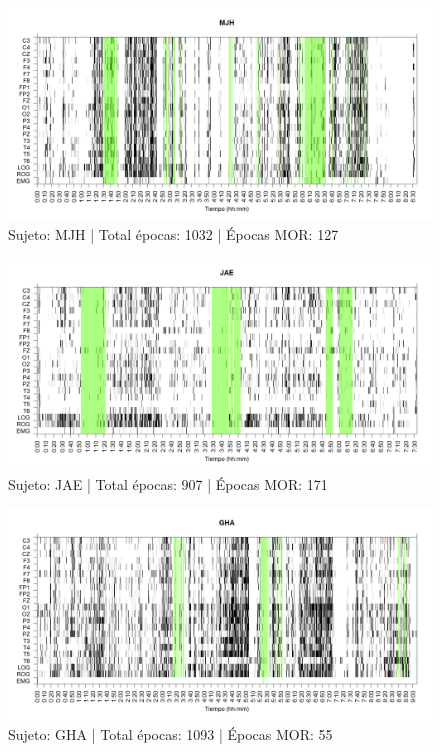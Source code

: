 \begin{figure}
\centering
\includegraphics[width=\linewidth]
{./muypreeliminar170408/MJNNVIGILOS_est.png} 
\caption{Sujeto: MJH | Total \'epocas: 1032 | \'Epocas MOR: 127
}
\label{grf:MJH}
\end{figure}


\begin{figure}
\centering
\includegraphics[width=\linewidth]
{./muypreeliminar170408/JANASUE_est.png} 
\caption{Sujeto: JAE | Total \'epocas: 907 | \'Epocas MOR: 171
}
\label{grf:JAE}
\end{figure}


\begin{figure}
\centering
\includegraphics[width=\linewidth]
{./muypreeliminar170408/GH24031950SUENNO_est.png} 
\caption{Sujeto: GHA | Total \'epocas: 1093 | \'Epocas MOR: 55
}
\label{grf:GHA}
\end{figure}

